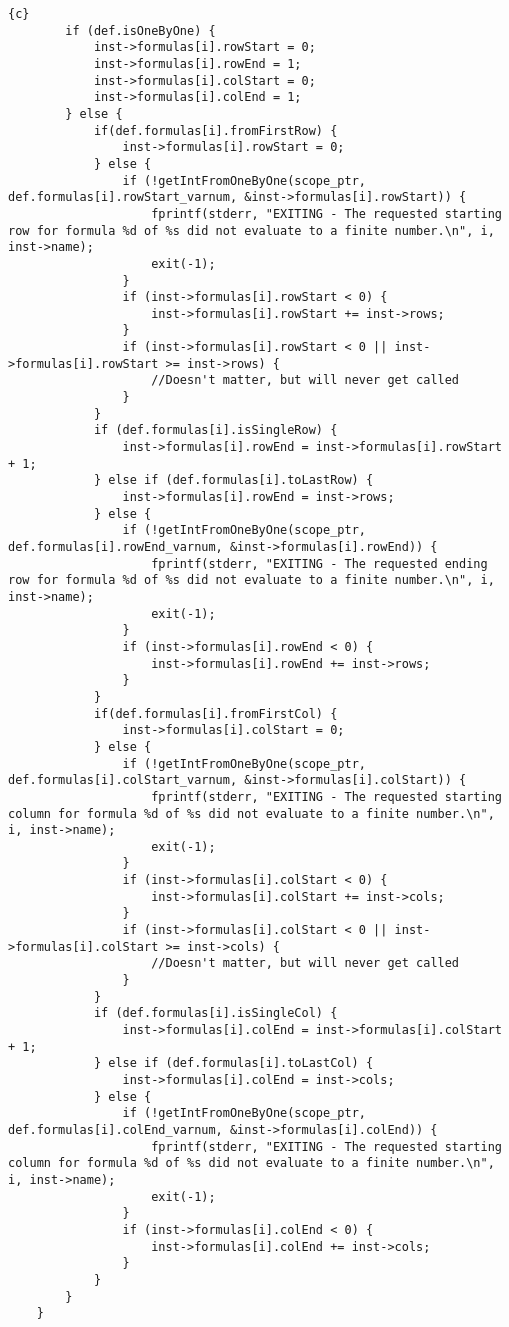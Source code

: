 \begin{lstlisting}{c}
		if (def.isOneByOne) {
			inst->formulas[i].rowStart = 0;
			inst->formulas[i].rowEnd = 1;
			inst->formulas[i].colStart = 0;
			inst->formulas[i].colEnd = 1;
		} else {
			if(def.formulas[i].fromFirstRow) {
				inst->formulas[i].rowStart = 0;
			} else {
				if (!getIntFromOneByOne(scope_ptr, def.formulas[i].rowStart_varnum, &inst->formulas[i].rowStart)) {
					fprintf(stderr, "EXITING - The requested starting row for formula %d of %s did not evaluate to a finite number.\n", i, inst->name);
					exit(-1);
				}
				if (inst->formulas[i].rowStart < 0) {
					inst->formulas[i].rowStart += inst->rows;
				}
				if (inst->formulas[i].rowStart < 0 || inst->formulas[i].rowStart >= inst->rows) {
					//Doesn't matter, but will never get called
				}
			}
			if (def.formulas[i].isSingleRow) {
				inst->formulas[i].rowEnd = inst->formulas[i].rowStart + 1;
			} else if (def.formulas[i].toLastRow) {
				inst->formulas[i].rowEnd = inst->rows;
			} else {
				if (!getIntFromOneByOne(scope_ptr, def.formulas[i].rowEnd_varnum, &inst->formulas[i].rowEnd)) {
					fprintf(stderr, "EXITING - The requested ending row for formula %d of %s did not evaluate to a finite number.\n", i, inst->name);
					exit(-1);
				}
				if (inst->formulas[i].rowEnd < 0) {
					inst->formulas[i].rowEnd += inst->rows;
				}
			}
			if(def.formulas[i].fromFirstCol) {
				inst->formulas[i].colStart = 0;
			} else {
				if (!getIntFromOneByOne(scope_ptr, def.formulas[i].colStart_varnum, &inst->formulas[i].colStart)) {
					fprintf(stderr, "EXITING - The requested starting column for formula %d of %s did not evaluate to a finite number.\n", i, inst->name);
					exit(-1);
				}
				if (inst->formulas[i].colStart < 0) {
					inst->formulas[i].colStart += inst->cols;
				}
				if (inst->formulas[i].colStart < 0 || inst->formulas[i].colStart >= inst->cols) {
					//Doesn't matter, but will never get called
				}
			}
			if (def.formulas[i].isSingleCol) {
				inst->formulas[i].colEnd = inst->formulas[i].colStart + 1;
			} else if (def.formulas[i].toLastCol) {
				inst->formulas[i].colEnd = inst->cols;
			} else {
				if (!getIntFromOneByOne(scope_ptr, def.formulas[i].colEnd_varnum, &inst->formulas[i].colEnd)) {
					fprintf(stderr, "EXITING - The requested starting column for formula %d of %s did not evaluate to a finite number.\n", i, inst->name);
					exit(-1);
				}
				if (inst->formulas[i].colEnd < 0) {
					inst->formulas[i].colEnd += inst->cols;
				}
			}
		}
	}


\end{lstlisting}

